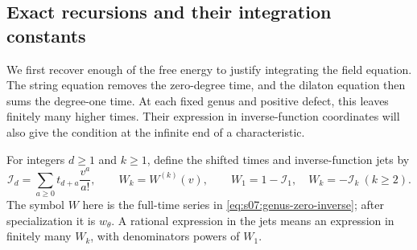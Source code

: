 \documentclass[a4paper,10pt]{article}
\numberwithin{equation}{section}
\theoremstyle{paperplain}
\theoremstyle{paperremark}
\theoremstyle{paperplain}
\begin{document}
\subsection{Exact recursions and their integration constants}
\label{subsec:s07:03}

We first recover enough of the free energy to justify integrating the
field equation. The string equation removes the zero-degree time, and
the dilaton equation then sums the degree-one time. At each fixed genus
and positive defect, this leaves finitely many higher times. Their expression in
inverse-function coordinates will also give the condition at the
infinite end of a characteristic.

For integers $d\geq1$ and $k\geq1$, define the shifted times and
inverse-function jets by
\begin{equation}\label{eq:s07:jets}
 \mathcal I_d=\sum_{a\geq0}t_{d+a}\frac{v^a}{a!},\qquad
 W_k=W^{(k)}(v),\qquad
 W_1=1-\mathcal I_1,\quad W_k=-\mathcal I_k\ (k\geq2).
\end{equation}
The symbol $W$ here is the full-time series in
\eqref{eq:s07:genus-zero-inverse}; after specialization it is
$w_\theta$. A rational expression in the jets means an expression in
finitely many $W_k$, with denominators powers of $W_1$.
\end{document}
